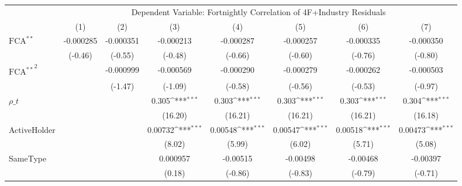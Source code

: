 {
\def\sym#1{\ifmmode^{#1}\else\(^{#1}\)\fi}
\begin{tabular}{l*{7}{c}}
\hline\hline
 & \multicolumn{7}{c}{Dependent Variable: Fortnightly Correlation of 4F+Industry Residuals}                 \\
 \cline{2-8}
                    &\multicolumn{1}{c}{(1)}         &\multicolumn{1}{c}{(2)}         &\multicolumn{1}{c}{(3)}         &\multicolumn{1}{c}{(4)}         &\multicolumn{1}{c}{(5)}         &\multicolumn{1}{c}{(6)}         &\multicolumn{1}{c}{(7)}         \\
\hline
$ \text{FCA}^{**} $ &   -0.000285         &   -0.000351         &   -0.000213         &   -0.000287         &   -0.000257         &   -0.000335         &   -0.000350         \\
                    &     (-0.46)         &     (-0.55)         &     (-0.48)         &     (-0.66)         &     (-0.60)         &     (-0.76)         &     (-0.80)         \\
[1em]
 $ { \text{FCA} ^{**} } ^2 $&                     &   -0.000999         &   -0.000569         &   -0.000290         &   -0.000279         &   -0.000262         &   -0.000503         \\
                    &                     &     (-1.47)         &     (-1.09)         &     (-0.58)         &     (-0.56)         &     (-0.53)         &     (-0.97)         \\
[1em]
$ \rho\_t $          &                     &                     &       0.305\sym{***}&       0.303\sym{***}&       0.303\sym{***}&       0.303\sym{***}&       0.304\sym{***}\\
                    &                     &                     &     (16.20)         &     (16.21)         &     (16.21)         &     (16.21)         &     (16.18)         \\
[1em]
ActiveHolder        &                     &                     &     0.00732\sym{***}&     0.00548\sym{***}&     0.00547\sym{***}&     0.00518\sym{***}&     0.00473\sym{***}\\
                    &                     &                     &      (8.02)         &      (5.99)         &      (6.02)         &      (5.71)         &      (5.08)         \\
[1em]
SameType            &                     &                     &    0.000957         &    -0.00515         &    -0.00498         &    -0.00468         &    -0.00397         \\
                    &                     &                     &      (0.18)         &     (-0.86)         &     (-0.83)         &     (-0.79)         &     (-0.71)         \\

\end{tabular}}
